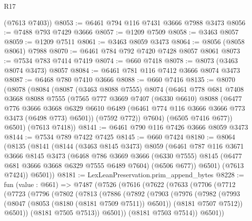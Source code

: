 \begin{lexlean}{R17}
\begin{coremodule}
      (@7613 @7403))
@8053 := @6461 @794 @116 @7431 @3666 @7988 @3473
@8056 := @7488 @793 @7429 @3666
@8057 := @1209 @7509
@8058 := @3463 @8057
@8059 := @1209 @7511
@8061 := @3463 @8059 @3473
@8064 := @8056 (@8058 @8061) @7988
@8070 := @6461 @784 @792 @7420 @7428 @8057 @8061
@8073 := @7534 @783 @7414 @7419
@8074 := @660 @7418
@8078 := @8073 (@3463 @8074 @3473) @8057
@8084 := @6461 @781 @116 @7412 @3666 @8074 @3473
@8087 := @6468 @780 @7410 @3666
@8088 := @660 @7416
@8135 := @8070
    (@8078
      (@8084
        (@8087
          (@3463 @8088 @7555)
          @8074
          (@6461
            @778
            @681
            @7408
            @3668
            @8088
            @7555
            (@7565
              @777
              @3669
              @7407
              (@6330 @6610)
              @8088
              (@6477
                @776
                @3666
                @3668
                @6329
                @6610
                @6489
                (@6461 @774 @116 @3666 @3666 @773 @3473 (@6498 @773) @6501))
              (@7592 @772))
            @7604)
          (@6505 @7416 @677))
        @6501)
      (@7613 @7418))
@8141 := @6461 @790 @116 @7426 @3666 @8059 @3473
@8144 := @7534 @789 @7422 @7425
@8145 := @660 @7424
@8180 := @8064
    (@8135
      (@8141
        (@8144
          (@3463 @8145 @3473)
          @8059
          (@6461
            @787
            @116
            @3671
            @3666
            @8145
            @3473
            (@6468
              @786
              @3669
              @3666
              (@6330 @7555)
              @8145
              (@6477 @681 @3666 @3668 @6329 @7555 @6489 @7604)
              (@6506 @677))
            @6501)
          (@7613 @7424))
        @6501))
@8181 := LexLeanPreservation.prim_append_bytes
@8228 := fun (value : @661) =>
  @7487
    (@7526
      (@7616
        (@7622
          (@7633
            (@7706
              (@7712
                (@7723
                  (@7796
                    (@7802
                      (@7813
                        (@7886
                          (@7892
                            (@7903
                              (@7976
                                (@7982
                                  (@7993
                                    (@8047 (@8053 (@8180 (@8181 @7509 @7511)) @6501))
                                    (@8181 @7507 @7512))
                                  @6501))
                              (@8181 @7505 @7513))
                            @6501))
                        (@8181 @7503 @7514))
                      @6501))

\end{coremodule}
\end{lexlean}
